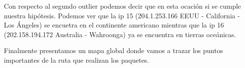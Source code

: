 Con respecto al segundo outlier podemos decir que en esta ocaci\'on si se cumple nuestra hip\'otesis. Podemos ver que la ip 15 (204.1.253.166    EEUU - California - Los \'Angeles) se encuetra en el continente americano mientras que la ip 16 (202.158.194.172  Australia - Wahroonga) ya se encuentra en tierras oce\'anicas. \newline

Finalmente presentamos un mapa global donde vamos a trazar los puntos importantes de la ruta que realizan los paquetes. 



